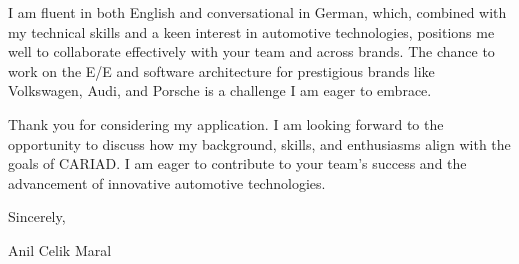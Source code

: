 \documentclass[11pt,a4paper]{article}
\begin{document}
\begin{flushleft}
I am fluent in both English and conversational in German, which, combined with 
my technical skills and a keen interest in automotive technologies, positions 
me well to collaborate effectively with your team and across brands. The 
chance to work on the E/E and software architecture for prestigious brands
like Volkswagen, Audi, and Porsche is a challenge I am eager to embrace.
\end{flushleft}

\begin{flushleft}
Thank you for considering my application. I am looking forward to the 
opportunity to discuss how my background, skills, and enthusiasms align 
with the goals of CARIAD. I am eager to contribute to your team's success 
and the advancement of innovative automotive technologies.
\end{flushleft}

\begin{flushleft}
Sincerely,
\end{flushleft}

\begin{flushleft}
Anil Celik Maral
\end{flushleft}
\end{document}

